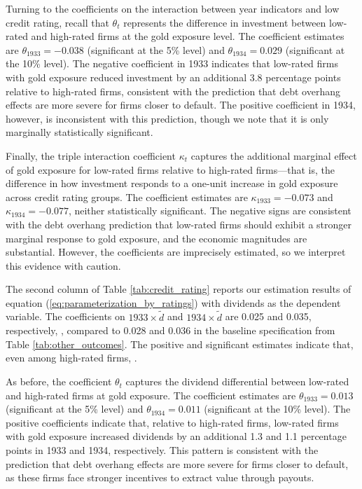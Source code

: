 Turning to the coefficients on the interaction between year indicators and low credit rating, recall that $\theta_t$ represents the difference in investment between low-rated and high-rated firms at the  gold exposure level. The coefficient estimates are $\theta_{1933} = -0.038$ (significant at the 5\% level) and $\theta_{1934} = 0.029$ (significant at the 10\% level). The negative coefficient in 1933 indicates that low-rated firms with  gold exposure reduced investment by an additional 3.8 percentage points relative to high-rated firms, consistent with the prediction that debt overhang effects are more severe for firms closer to default. The positive coefficient in 1934, however, is inconsistent with this prediction, though we note that it is only marginally statistically significant.

Finally, the triple interaction coefficient $\kappa_t$ captures the additional marginal effect of gold exposure for low-rated firms relative to high-rated firms---that is, the difference in how investment responds to a one-unit increase in gold exposure across credit rating groups. The coefficient estimates are $\kappa_{1933} = -0.073$ and $\kappa_{1934} = -0.077$, neither statistically significant. The negative signs are consistent with the debt overhang prediction that low-rated firms should exhibit a stronger marginal response to gold exposure, and the economic magnitudes are substantial. However, the coefficients are imprecisely estimated, so we interpret this evidence with caution.

The second column of Table \ref{tab:credit_rating} reports our estimation results of equation (\ref{eq:parameterization_by_ratings}) with dividends as the dependent variable. The coefficients on $1933 \times \tilde{d}$ and $1934 \times \tilde{d}$ are 0.025 and 0.035, respectively, , compared to 0.028 and 0.036 in the baseline specification from Table \ref{tab:other_outcomes}. The positive and significant estimates indicate that, even among high-rated firms, .

As before, the coefficient $\theta_t$ captures the dividend differential between low-rated and high-rated firms at  gold exposure. The coefficient estimates are $\theta_{1933} = 0.013$ (significant at the 5\% level) and $\theta_{1934} = 0.011$ (significant at the 10\% level). The positive coefficients indicate that, relative to high-rated firms, low-rated firms with  gold exposure increased dividends by an additional 1.3 and 1.1 percentage points in 1933 and 1934, respectively. This pattern is consistent with the prediction that debt overhang effects are more severe for firms closer to default, as these firms face stronger incentives to extract value through payouts.

